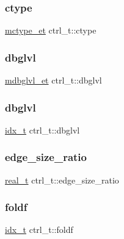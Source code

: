 \subsubsection{\texorpdfstring{ctype}{ctype}}
{\footnotesize\ttfamily \hyperlink{a00876_a51d3bfb2bd8dc4a84636b2b489f575bc}{mctype\+\_\+et} ctrl\+\_\+t\+::ctype}

\mbox{\label{a00742_a97ccd0cc307eee1c430679f6a9d41d0c}} 
\subsubsection{\texorpdfstring{dbglvl}{dbglvl}\hspace{0.1cm}{\footnotesize\ttfamily [1/2]}}
{\footnotesize\ttfamily \hyperlink{a00876_ac50415aa8003f9b7bf0aabb2b0d50877}{mdbglvl\+\_\+et} ctrl\+\_\+t\+::dbglvl}

\mbox{\label{a00742_ae2d53d37f183ef45aced58a216e842aa}} 
\subsubsection{\texorpdfstring{dbglvl}{dbglvl}\hspace{0.1cm}{\footnotesize\ttfamily [2/2]}}
{\footnotesize\ttfamily \hyperlink{a00876_aaa5262be3e700770163401acb0150f52}{idx\+\_\+t} ctrl\+\_\+t\+::dbglvl}

\mbox{\label{a00742_af09d1b1edf1d1eb790724d438140844c}} 
\subsubsection{\texorpdfstring{edge\+\_\+size\+\_\+ratio}{edge\_size\_ratio}}
{\footnotesize\ttfamily \hyperlink{a00876_a1924a4f6907cc3833213aba1f07fcbe9}{real\+\_\+t} ctrl\+\_\+t\+::edge\+\_\+size\+\_\+ratio}

\mbox{\label{a00742_a5684e75db9dee5cd1bba60ce95a2494a}} 
\subsubsection{\texorpdfstring{foldf}{foldf}}
{\footnotesize\ttfamily \hyperlink{a00876_aaa5262be3e700770163401acb0150f52}{idx\+\_\+t} ctrl\+\_\+t\+::foldf}

